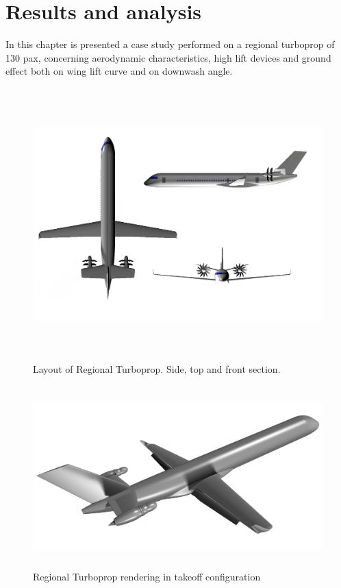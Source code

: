 
\chapter{Results and analysis}
\label{ch3}

In this chapter is presented a case study performed on a regional turboprop of 130 pax, concerning aerodynamic characteristics, high lift devices and ground effect both on wing lift curve and on downwash angle.

\begin{figure}[H]
	\centering
	\includegraphics[height=10.5cm, keepaspectratio ]{Immagini/Capitolo3/IRON} 
	\caption{Layout of Regional Turboprop. Side, top and front section.} %
	\label{fig:figura3_0} %
\end{figure}

\begin{figure}[H]
	\centering
	\includegraphics[height=7cm, keepaspectratio ]{Immagini/Capitolo3/IRON_TAKE_OFF} 
	\caption{Regional Turboprop rendering in takeoff configuration} %
	\label{fig:figura3_01} %
\end{figure}

